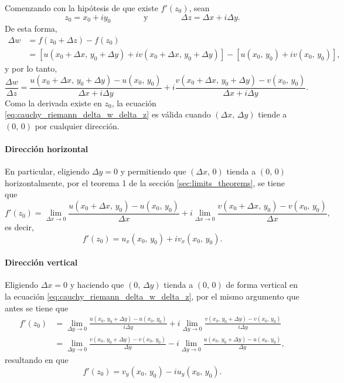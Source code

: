 \documentclass[a4paper]{report}
\begin{document}
Comenzando con la hipótesis de que existe \(f'(z_0)\), sean
\[
 z_0=x_0+iy_0
  \qquad\qquad\textrm{y}\qquad\qquad
 \Delta z=\Delta x+i\Delta y.
\]
De esta forma,
\begin{align*}
 \Delta w&=f(z_0+\Delta z)-f(z_0)\\
  &=[u(x_0+\Delta x,\,y_0+\Delta y)+iv(x_0+\Delta x,\,y_0+\Delta y)]-[u(x_0,\,y_0)+iv(x_0,\,y_0)],
\end{align*}
y por lo tanto,
\begin{equation}\label{eq:cauchy_riemann_delta_w_delta_z}
 \frac{\Delta w}{\Delta z}=\frac{u(x_0+\Delta x,\,y_0+\Delta y)-u(x_0,\,y_0)}{\Delta x+i\Delta y}+i\frac{v(x_0+\Delta x,\,y_0+\Delta y)-v(x_0,\,y_0)}{\Delta x+i\Delta y}.
\end{equation}
Como la derivada existe en \(z_0\), la ecuación \ref{eq:cauchy_riemann_delta_w_delta_z} es válida cuando \((\Delta x,\,\Delta y)\) tiende a \((0,\,0)\) por cualquier dirección.
\paragraph{Dirección horizontal} En particular, eligiendo \(\Delta y=0\) y permitiendo que \((\Delta x,\,0)\) tienda a \((0,\,0)\) horizontalmente, por el teorema 1 de la sección \ref{sec:limits_theorems}, se tiene que 
\[
 f'(z_0)=\lim_{\Delta x\to0}\frac{u(x_0+\Delta x,\,y_0)-u(x_0,\,y_0)}{\Delta x}+i\lim_{\Delta x\to0}\frac{v(x_0+\Delta x,\,y_0)-v(x_0,\,y_0)}{\Delta x},
\]
es decir,
\begin{equation}\label{eq:cauchy_riemann_partial_x}
 f'(z_0)=u_x(x_0,\,y_0)+iv_x(x_0,\,y_0).
\end{equation}
\paragraph{Dirección vertical} Eligiendo \(\Delta x=0\) y haciendo que \((0,\,\Delta y)\) tienda a \((0,\,0)\) de forma vertical en la ecuación \ref{eq:cauchy_riemann_delta_w_delta_z}, por el mismo argumento que antes se tiene que  
\begin{align*}
 f'(z_0)&=\lim_{\Delta y\to0}\frac{u(x_0,\,y_0+\Delta y)-u(x_0,\,y_0)}{i\Delta y}+i\lim_{\Delta y\to0}\frac{v(x_0,\,y_0+\Delta y)-v(x_0,\,y_0)}{i\Delta y}\\
  &=\lim_{\Delta y\to0}\frac{v(x_0,\,y_0+\Delta y)-v(x_0,\,y_0)}{\Delta y}-i\lim_{\Delta y\to0}\frac{u(x_0,\,y_0+\Delta y)-u(x_0,\,y_0)}{\Delta y},
\end{align*}
resultando en que 
\begin{equation}\label{eq:cauchy_riemann_partial_y}
 f'(z_0)=v_y(x_0,\,y_0)-iu_y(x_0,\,y_0). 
\end{equation}
\end{document}
